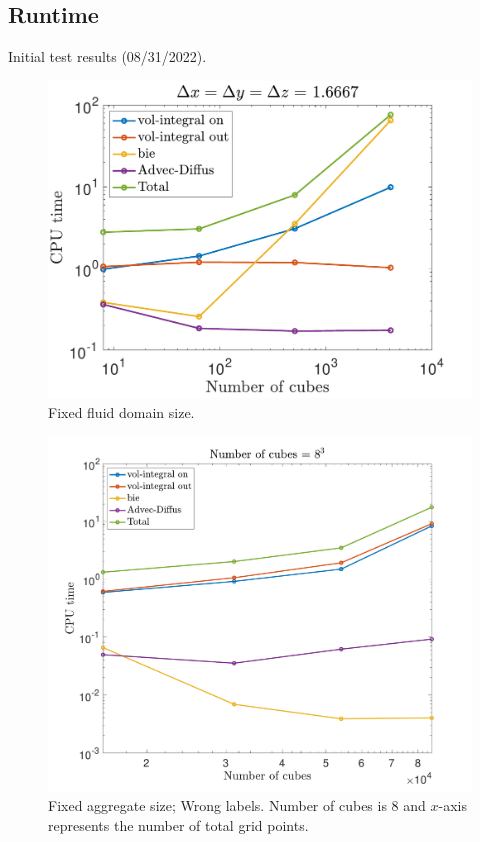 \subsection{Runtime}
Initial test results (08/31/2022).

\begin{figure}[h]
	\begin{center}
		\vspace{0.5cm}
		\includegraphics[scale=0.5]{./figures/fig_test_time1_fixNx}
	
	\caption{Fixed fluid domain size.}
	\label{fig_test_time1_fixNx}
\end{center}
\end{figure}

\begin{figure}[h]
	\begin{center}
		\vspace{0.5cm}
		\includegraphics[scale=0.35]{./figures/fig_test_time1_varNx}
	
	\caption{Fixed aggregate size; Wrong labels. Number of cubes is $8$ and $x$-axis represents the number of total grid points. }
	\label{fig_test_time1_varNx}
\end{center}
\end{figure}

